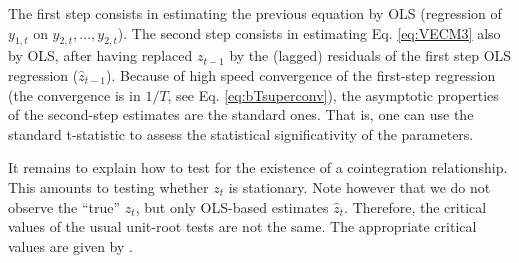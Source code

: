 \documentclass[
  11pt,
]{book}
\theoremstyle{definition}
\theoremstyle{definition}
\theoremstyle{definition}
\theoremstyle{definition}
\theoremstyle{remark}
\begin{document}
The first step consists in estimating the previous equation by OLS (regression of \(y_{1,t}\) on \(y_{2,t},\dots,y_{2,t}\)). The second step consists in estimating Eq. \eqref{eq:VECM3} also by OLS, after having replaced \(z_{t-1}\) by the (lagged) residuals of the first step OLS regression (\(\hat{z}_{t-1}\)). Because of high speed convergence of the first-step regression (the convergence is in \(1/T\), see Eq. \eqref{eq:bTsuperconv}), the asymptotic properties of the second-step estimates are the standard ones. That is, one can use the standard t-statistic to assess the statistical significativity of the parameters.

It remains to explain how to test for the existence of a cointegration relationship. This amounts to testing whether \(z_t\) is stationary. Note however that we do not observe the ``true'' \(z_t\), but only OLS-based estimates \(\hat{z}_t\). Therefore, the critical values of the usual unit-root tests are not the same. The appropriate critical values are given by \citet{Phillips_Ouliaris_1990}.
\end{document}

